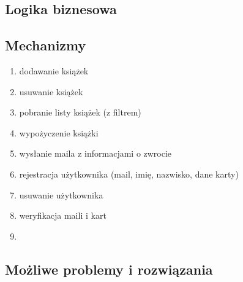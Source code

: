 \documentclass[]{report}
\begin{document}
\subsection{Logika biznesowa}

\subsection{Mechanizmy}

\begin{enumerate}
	\item dodawanie książek
	\item usuwanie książek
    \item pobranie listy książek (z filtrem)
    \item wypożyczenie książki
    \item wysłanie maila z informacjami o zwrocie
	\item rejestracja użytkownika (mail, imię, nazwisko, dane karty)
    \item usuwanie użytkownika
    \item weryfikacja maili i kart
    \item 
\end{enumerate}



\subsection{Możliwe problemy i rozwiązania}
\end{document}
